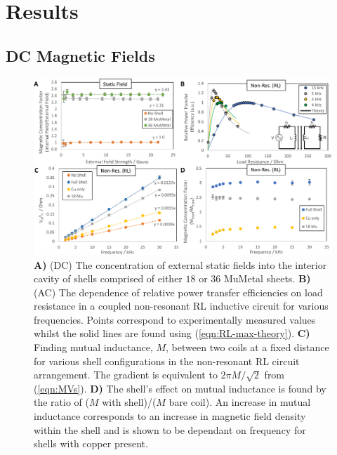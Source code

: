 \documentclass[11pt]{iopart}
\begin{document}
\section{Results}
\subsection{DC Magnetic Fields}

\begin{figure}
  \begin{center}
   \noindent\includegraphics[width=\linewidth]{images/compoundRL-inset.pdf}
  \end{center}
  \caption{
    \textbf{A)} (DC) The concentration of external static fields into
    the interior cavity of shells comprised of either $18$ or $36$
    MuMetal sheets.
    \textbf{B)} (AC) The dependence of relative power transfer
    efficiencies on load resistance in a coupled non-resonant RL
    inductive circuit for various frequencies. Points correspond to
    experimentally measured values whilst the solid lines are found
    using (\ref{eqn:RL-max-theory}).
    \textbf{C)} Finding mutual inductance, $M$, between two coils at a
    fixed distance for various shell configurations in the non-resonant RL circuit
    arrangement.  The gradient is equivalent to $2\pi M/\sqrt{2}$
    from (\ref{eqn:MVs}).
    \textbf{D)} The shell's effect on mutual inductance is found by the
    ratio of ($M$ with shell)/($M$ bare coil). An increase in mutual
    inductance corresponds to an increase in magnetic field density
    within the shell and is shown to be dependant on frequency for
    shells with copper present.}
  \label{fig:DC_RL}
  \vspace{-0.7em}
\end{figure}
\end{document}

